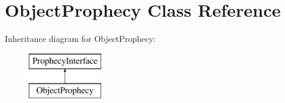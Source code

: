 \hypertarget{class_prophecy_1_1_prophecy_1_1_object_prophecy}{}\section{Object\+Prophecy Class Reference}
\label{class_prophecy_1_1_prophecy_1_1_object_prophecy}
Inheritance diagram for Object\+Prophecy\+:\begin{figure}[H]
\begin{center}
\leavevmode
\includegraphics[height=2.000000cm]{class_prophecy_1_1_prophecy_1_1_object_prophecy}
\end{center}
\end{figure}
